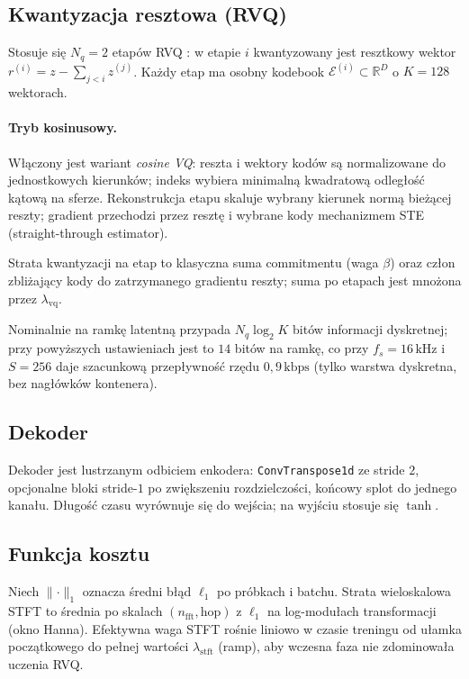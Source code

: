 \documentclass[11pt,a4paper]{article}
\begin{document}
\subsection{Kwantyzacja resztowa (RVQ)}

Stosuje się $N_q = 2$ etapów RVQ \cite{soundstream,encodec}: w etapie $i$ kwantyzowany jest resztkowy wektor $r^{(i)} = z - \sum_{j<i} \hat z^{(j)}$.
Każdy etap ma osobny kodebook $\mathcal{E}^{(i)} \subset \mathbb{R}^D$ o $K = 128$ wektorach.

\paragraph{Tryb kosinusowy.}
Włączony jest wariant \emph{cosine VQ}: reszta i wektory kodów są normalizowane do jednostkowych kierunków; indeks wybiera minimalną kwadratową odległość kątową na sferze. Rekonstrukcja etapu skaluje wybrany kierunek normą bieżącej reszty; gradient przechodzi przez resztę i wybrane kody mechanizmem STE (straight-through estimator).

Strata kwantyzacji na etap to klasyczna suma commitmentu (waga $\beta$) oraz człon zbliżający kody do zatrzymanego gradientu reszty; suma po etapach jest mnożona przez $\lambda_{\mathrm{vq}}$.

Nominalnie na ramkę latentną przypada $N_q \log_2 K$ bitów informacji dyskretnej; przy powyższych ustawieniach jest to $14$ bitów na ramkę, co przy $f_s = 16\,\mathrm{kHz}$ i $S = 256$ daje szacunkową przepływność rzędu $0{,}9\,\mathrm{kbps}$ (tylko warstwa dyskretna, bez nagłówków kontenera).

\subsection{Dekoder}

Dekoder jest lustrzanym odbiciem enkodera: \texttt{ConvTranspose1d} ze stride $2$, opcjonalne bloki stride-$1$ po zwiększeniu rozdzielczości, końcowy splot do jednego kanału. Długość czasu wyrównuje się do wejścia; na wyjściu stosuje się $\tanh$.

\subsection{Funkcja kosztu}

Niech $\lVert \cdot \rVert_1$ oznacza średni błąd $\ell_1$ po próbkach i batchu. Strata wieloskalowa STFT to średnia po skalach $(n_{\mathrm{fft}}, \mathrm{hop})$ z $\ell_1$ na log-modułach transformacji (okno Hanna). Efektywna waga STFT rośnie liniowo w czasie treningu od ułamka początkowego do pełnej wartości $\lambda_{\mathrm{stft}}$ (ramp), aby wczesna faza nie zdominowała uczenia RVQ.
\end{document}
